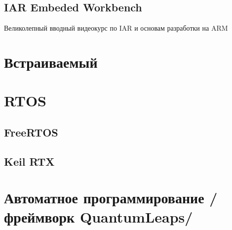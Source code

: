 \chapter{IAR Embeded Workbench}

Великолепный вводный видеокурс по IAR и основам разработки на ARM


\part{Встраиваемый \cpp}

\part{RTOS}
\chapter{FreeRTOS}
\chapter{Keil RTX}

\part{Автоматное программирование /фреймворк QuantumLeaps/}




